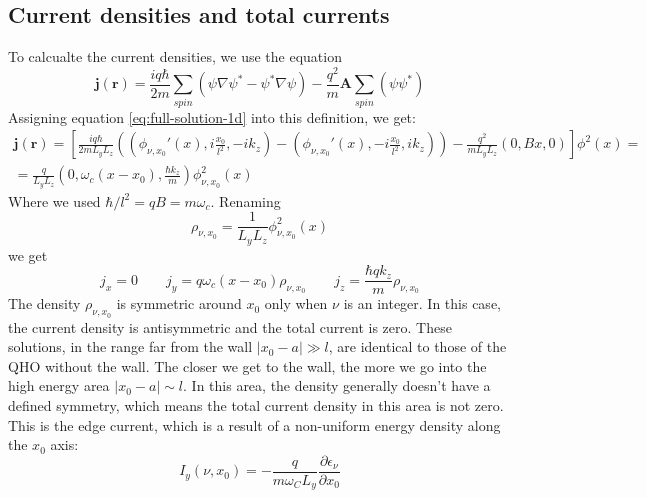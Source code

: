 \documentclass{article}
\begin{document}
\subsection{Current densities and total currents}
To calcualte the current densities, we use the equation
\begin{equation}
    \boldsymbol{j}(\boldsymbol{r}) = \frac{iq\hbar}{2m}\sum_{spin}\left(\psi\nabla\psi^* - \psi^*\nabla\psi\right) - \frac{q^2}{m}\boldsymbol{A}\sum_{spin}\left(\psi\psi^*\right)
\end{equation}
Assigning equation \ref{eq:full-solution-1d} into this definition, we get:
\begin{equation}
\begin{gathered}
    \boldsymbol{j}(\boldsymbol{r}) = \left[
        \frac{iq\hbar}{2mL_yL_z}\left(
        \left(\phi_{\nu,x_0}'(x), i\frac{x_0}{l^2}, -ik_z\right) - 
        \left(\phi_{\nu,x_0}'(x), -i\frac{x_0}{l^2}, ik_z\right)
    \right) - \frac{q^2}{mL_yL_z}\left(0, Bx, 0\right)
    \right]\phi^2(x) = \\ =
    \frac{q}{L_yL_z}\left(0, \omega_c\left(x - x_0\right), \frac{\hbar k_z}{m}\right)\phi_{\nu,x_0}^2(x)
\end{gathered}
\end{equation}
Where we used $\hbar/l^2 = qB = m\omega_c$. Renaming
\begin{equation}
    \rho_{\nu,x_0} = \frac{1}{L_yL_z}\phi_{\nu,x_0}^2(x)
\end{equation}
we get
\begin{equation}
    j_x = 0 \qquad j_y = q\omega_c(x-x_0)\rho_{\nu,x_0} \qquad j_z = \frac{\hbar q k_z}{m}\rho_{\nu,x_0}
\end{equation}
The density $\rho_{\nu,x_0}$ is symmetric around $x_0$ only when $\nu$ is an integer. In this case, the current density is antisymmetric and the total current is zero. These solutions, in the range far from the wall $|x_0 - a| \gg l$, are identical to those of the QHO without the wall.
\newline
The closer we get to the wall, the more we go into the high energy area $|x_0 - a| \sim l$. In this area, the density generally doesn't have a defined symmetry, which means the total current density in this area is not zero. This is the edge current, which is a result of a non-uniform energy density along the $x_0$ axis:
\begin{equation}
    I_y(\nu, x_0) = -\frac{q}{m\omega_CL_y}\frac{\partial \epsilon_\nu}{\partial x_0}
\end{equation}
\end{document}
